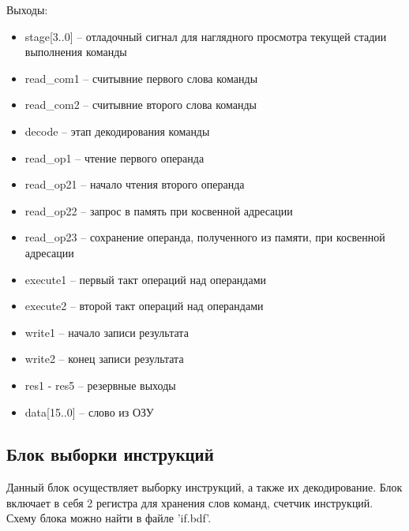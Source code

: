 Выходы:
\begin{itemize}
    \item stage[3..0] -- отладочный сигнал для наглядного просмотра текущей стадии выполнения команды
    \item read\_com1 -- считывние первого слова команды
    \item read\_com2 -- считывние второго слова команды
    \item decode -- этап декодирования команды
    \item read\_op1 -- чтение первого операнда
    \item read\_op21 -- начало чтения второго операнда
    \item read\_op22 -- запрос в память при косвенной адресации
    \item read\_op23 -- сохранение операнда, полученного из памяти, при косвенной адресации
    \item execute1 -- первый такт операций над операндами
    \item execute2 -- второй такт операций над операндами
    \item write1 -- начало записи результата
    \item write2 -- конец записи результата
    \item res1 - res5 -- резервные выходы
    \item data[15..0] -- слово из ОЗУ
\end{itemize}

\subsection{Блок выборки инструкций}
Данный блок осуществляет выборку инструкций, а также их декодирование.
Блок включает в себя 2 регистра для хранения слов команд, счетчик инструкций.
Схему блока можно найти в файле 'if.bdf'.

